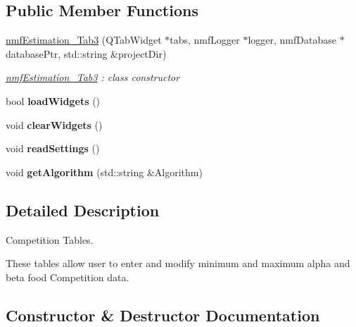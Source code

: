 \subsection*{Public Member Functions}
\begin{DoxyCompactItemize}
\item 
\hyperlink{classnmf_estimation___tab3_a66d00a2486349efb1fc71f6e5a83f306}{nmf\+Estimation\+\_\+\+Tab3} (Q\+Tab\+Widget $\ast$tabs, nmf\+Logger $\ast$logger, nmf\+Database $\ast$database\+Ptr, std\+::string \&project\+Dir)
\begin{DoxyCompactList}\small\item\em \hyperlink{classnmf_estimation___tab3}{nmf\+Estimation\+\_\+\+Tab3} \+: class constructor \end{DoxyCompactList}\item 
bool {\bfseries load\+Widgets} ()\hypertarget{classnmf_estimation___tab3_ae5a06add9874cf6f04c5890090a500bc}{}\label{classnmf_estimation___tab3_ae5a06add9874cf6f04c5890090a500bc}

\item 
void {\bfseries clear\+Widgets} ()\hypertarget{classnmf_estimation___tab3_ac181a0f5624567062f2de767e3053b73}{}\label{classnmf_estimation___tab3_ac181a0f5624567062f2de767e3053b73}

\item 
void {\bfseries read\+Settings} ()\hypertarget{classnmf_estimation___tab3_a1c9101256d17a175fefefd3562a9cb8b}{}\label{classnmf_estimation___tab3_a1c9101256d17a175fefefd3562a9cb8b}

\item 
void {\bfseries get\+Algorithm} (std\+::string \&Algorithm)\hypertarget{classnmf_estimation___tab3_aa396e8a347ab98dd3c5029020cdac57e}{}\label{classnmf_estimation___tab3_aa396e8a347ab98dd3c5029020cdac57e}

\end{DoxyCompactItemize}


\subsection{Detailed Description}
Competition Tables. 

These tables allow user to enter and modify minimum and maximum alpha and beta food Competition data. 

\subsection{Constructor \& Destructor Documentation}
